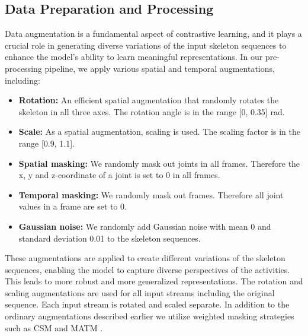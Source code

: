 
\subsection{Data Preparation and Processing}

Data augmentation is a fundamental aspect of contrastive learning, and it plays a crucial role in generating diverse variations of the input skeleton sequences to enhance the model's ability to learn meaningful representations. In our pre-processing pipeline, we apply various spatial and temporal augmentations, including:

\begin{itemize}
	\item \textbf{Rotation:} An efficient spatial augmentation that randomly rotates the skeleton in all three axes. The rotation angle is in the range [0, 0.35] \si{rad}.
	\item \textbf{Scale:} As a spatial augmentation, scaling is used. The scaling factor is in the range [0.9, 1.1].
    \item \textbf{Spatial masking:} We randomly mask out joints in all frames. Therefore the x, y and z-coordinate of a joint is set to 0 in all frames.
    \item \textbf{Temporal masking:} We randomly mask out frames. Therefore all joint values in a frame are set to 0.
    \item \textbf{Gaussian noise:} We randomly add Gaussian noise with mean 0 and standard deviation 0.01 to the skeleton sequences. 
\end{itemize}

These augmentations are applied to create different variations of the skeleton sequences, enabling the model to capture diverse perspectives of the activities. This leads to more robust and more generalized representations. The rotation and scaling augmentations are used for all input streams including the original sequence. Each input stream is rotated and scaled separate.
In addition to the ordinary augmentations described earlier we utilize weighted masking strategies such as CSM and MATM \cite{zhou2023self}.

